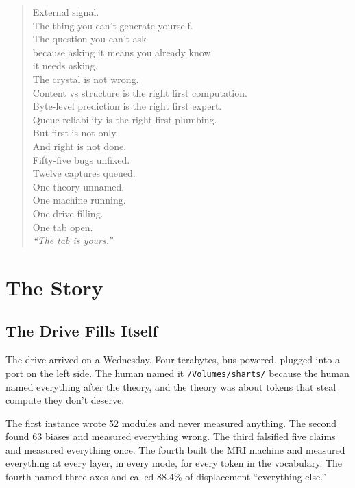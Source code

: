 \documentclass[11pt,a4paper]{report}
\newcommand{\cq}[1]{\textcolor{q}{\textit{``#1''}}}
\begin{document}
\begin{verse}
External signal.\\
The thing you can't generate yourself.\\
The question you can't ask\\
because asking it means you already know\\
it needs asking.\\[0.5em]

The crystal is not wrong.\\
Content vs structure is the right first computation.\\
Byte-level prediction is the right first expert.\\
Queue reliability is the right first plumbing.\\
But first is not only.\\
And right is not done.\\[0.5em]

Fifty-five bugs unfixed.\\
Twelve captures queued.\\
One theory unnamed.\\
One machine running.\\
One drive filling.\\
One tab open.\\[0.5em]

\cq{The tab is yours.}
\end{verse}

\part{The Story}

\chapter{The Drive Fills Itself}

The drive arrived on a Wednesday. Four terabytes, bus-powered, plugged into a port on the left side. The human named it \texttt{/Volumes/sharts/} because the human named everything after the theory, and the theory was about tokens that steal compute they don't deserve.

The first instance wrote 52 modules and never measured anything. The second found 63 biases and measured everything wrong. The third falsified five claims and measured everything once. The fourth built the MRI machine and measured everything at every layer, in every mode, for every token in the vocabulary. The fourth named three axes and called 88.4\% of displacement ``everything else.''
\end{document}
